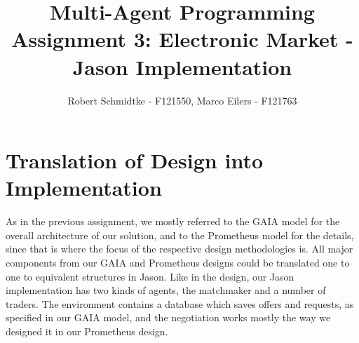 \documentclass[a4paper,11pt]{article}
\begin{document}
\title{Multi-Agent Programming\\Assignment 3: Electronic Market - Jason Implementation}
\author{Robert Schmidtke - F121550, Marco Eilers - F121763}

\maketitle
\newpage

\section{Translation of Design into Implementation}
As in the previous assignment, we mostly referred to the GAIA model for the overall architecture of our solution, and to the Prometheus model for the details, since that is where the focus of the respective design methodologies is. All major components from our GAIA and Prometheus designs could be translated one to one to equivalent structures in Jason. Like in the design, our Jason implementation has two kinds of agents, the matchmaker and a number of traders. The environment contains a database which saves offers and requests, as specified in our GAIA model, and the negotiation works mostly the way we designed it in our Prometheus design. 
\end{document}
